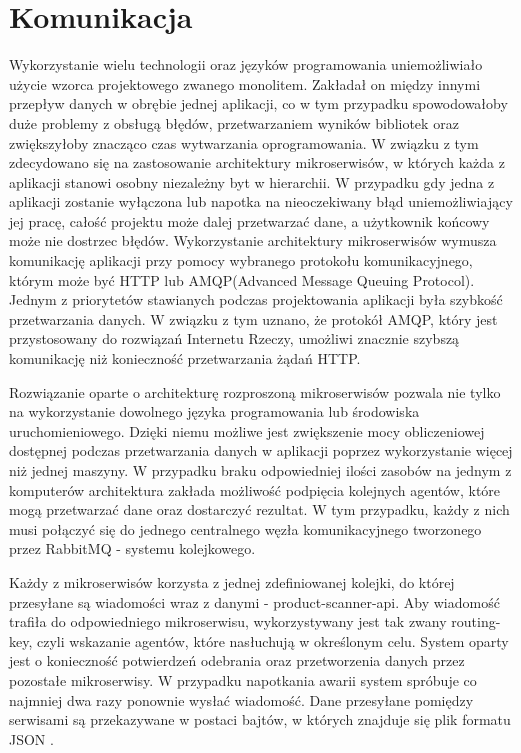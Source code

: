 \section{Komunikacja}
{Wykorzystanie wielu technologii oraz języków programowania uniemożliwiało użycie wzorca projektowego zwanego monolitem. Zakładał on między innymi przepływ danych w obrębie jednej aplikacji, co w tym przypadku spowodowałoby duże problemy z obsługą błędów, przetwarzaniem wyników bibliotek oraz zwiększyłoby znacząco czas wytwarzania oprogramowania. W związku z tym zdecydowano się na zastosowanie architektury mikroserwisów, w których każda z aplikacji stanowi osobny niezależny byt w hierarchii. W przypadku gdy jedna z aplikacji zostanie wyłączona lub napotka na nieoczekiwany błąd uniemożliwiający jej pracę, całość projektu może dalej przetwarzać dane, a użytkownik końcowy może nie dostrzec błędów. Wykorzystanie architektury mikroserwisów wymusza komunikację aplikacji przy pomocy wybranego protokołu komunikacyjnego, którym może być HTTP lub AMQP(Advanced Message Queuing Protocol)\cite{AMQP}. Jednym z priorytetów stawianych podczas projektowania aplikacji była szybkość przetwarzania danych. W związku z tym uznano, że protokół AMQP, który jest przystosowany do rozwiązań Internetu Rzeczy, umożliwi znacznie szybszą komunikację niż konieczność przetwarzania żądań HTTP. 
	
	
Rozwiązanie oparte o architekturę rozproszoną mikroserwisów pozwala nie tylko na wykorzystanie dowolnego języka programowania lub środowiska uruchomieniowego. Dzięki niemu możliwe jest zwiększenie mocy obliczeniowej dostępnej podczas przetwarzania danych w aplikacji poprzez wykorzystanie więcej niż jednej maszyny. W przypadku braku odpowiedniej ilości zasobów na jednym z komputerów architektura zakłada możliwość podpięcia kolejnych agentów, które mogą przetwarzać dane oraz dostarczyć rezultat. W tym przypadku, każdy z nich musi połączyć się do jednego centralnego węzła komunikacyjnego tworzonego przez RabbitMQ \cite{RabbitMQ} - systemu kolejkowego.

Każdy z mikroserwisów korzysta z jednej zdefiniowanej kolejki, do której przesyłane są wiadomości wraz z danymi - product-scanner-api. Aby wiadomość trafiła do odpowiedniego mikroserwisu, wykorzystywany jest tak zwany routing-key, czyli wskazanie agentów, które nasłuchują w określonym celu. System oparty jest o konieczność potwierdzeń odebrania oraz przetworzenia danych przez pozostałe mikroserwisy. W przypadku napotkania awarii system spróbuje co najmniej dwa razy ponownie wysłać wiadomość. Dane przesyłane pomiędzy serwisami są przekazywane w postaci bajtów, w których znajduje się plik formatu JSON \cite{JSON}. 
}
	
